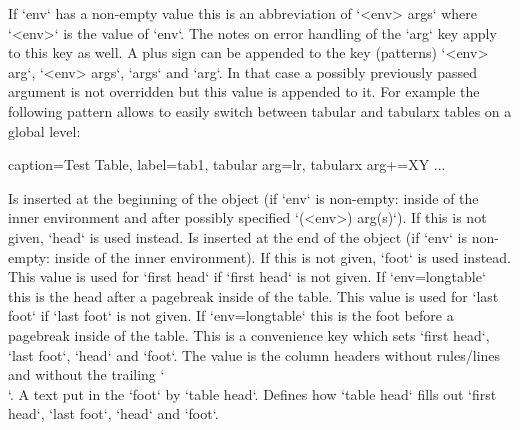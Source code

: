   \begin{examplecode}
  \end{examplecode}

  If `env` has a non-empty value this is an abbreviation of `<env> args` where `<env>` is the value of `env`.
  The notes on error handling of the `arg` key apply to this key as well.
  A plus sign can be appended to the key (patterns) `<env> arg`, `<env> args`, `args` and `arg`.
  In that case a possibly previously passed argument is not overridden but this value is appended to it.
  For example the following pattern allows to easily switch between tabular and tabularx tables on a global level:

  \begin{examplecode}

  \begin{tableobject}{caption=Test Table, label=tab1, tabular arg=lr, tabularx arg+=XY}
      ...
  \end{tableobject}
  \end{examplecode}

\bigpar

  Is inserted at the beginning of the object (if `env` is non-empty: inside of the inner environment and after possibly specified `(<env>) arg(s)`).
  If this is not given, `head` is used instead.
  Is inserted at the end of the object (if `env` is non-empty: inside of the inner environment).
  If this is not given, `foot` is used instead.
  This value is used for `first head` if `first head` is not given.
  If `env=longtable` this is the head after a pagebreak inside of the table.
  This value is used for `last foot` if `last foot` is not given.
  If `env=longtable` this is the foot before a pagebreak inside of the table.
  This is a convenience key which sets `first head`, `last foot`, `head` and `foot`.
  The value is the column headers without rules\slash lines and without the trailing `\\`.
  A text put in the `foot` by `table head`.
  Defines how `table head` fills out `first head`, `last foot`, `head` and `foot`.

